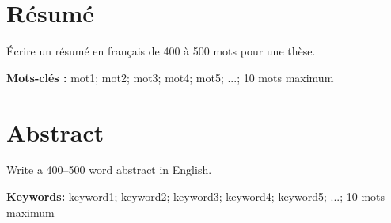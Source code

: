\chapter*{Résumé}
Écrire un résumé en français de 400 à 500 mots pour une thèse.

\noindent\textbf{Mots-clés :} mot1; mot2; mot3; mot4; mot5; ...; 10 mots maximum
\newpage

\newpage
\chapter*{Abstract}
Write a 400–500 word abstract in English.

\noindent\textbf{Keywords:} keyword1; keyword2; keyword3; keyword4; keyword5; ...; 10 mots maximum
\newpage